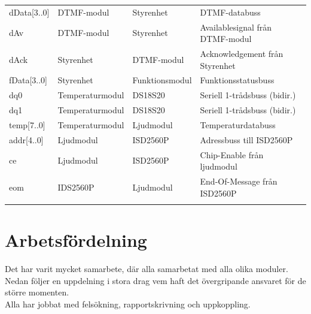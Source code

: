 \documentclass[a4paper,11pt]{article}
\begin{document}
\begin{table} [H]
\begin{tabular}{l l l l}
		dData[3..0] & DTMF-modul & Styrenhet & DTMF-databuss\\
		dAv & DTMF-modul & Styrenhet & Availablesignal från DTMF-modul\\
		dAck & Styrenhet & DTMF-modul & Acknowledgement från Styrenhet\\

		fData[3..0] & Styrenhet & Funktionsmodul & Funktionsstatusbuss\\

		dq0 & Temperaturmodul & DS18S20 & Seriell 1-trådsbuss (bidir.)\\
		dq1 & Temperaturmodul & DS18S20 & Seriell 1-trådsbuss (bidir.)\\

		temp[7..0] & Temperaturmodul & Ljudmodul & Temperaturdatabuss\\

		addr[4..0] & Ljudmodul & ISD2560P & Adressbuss till ISD2560P\\
		ce & Ljudmodul & ISD2560P & Chip-Enable från ljudmodul\\
		eom & IDS2560P & Ljudmodul & End-Of-Message från ISD2560P\\\\
	\end{tabular}
	\end{table}
\pagebreak
	\section{Arbetsfördelning}
	\label{sec:arbetsSec}
	
		Det har varit mycket samarbete, där alla samarbetat med alla olika moduler. \\
		Nedan följer en uppdelning i stora drag vem haft det övergripande ansvaret för de större momenten. \\
		Alla har jobbat med felsökning, rapportskrivning och uppkoppling.
	
\end{document}
